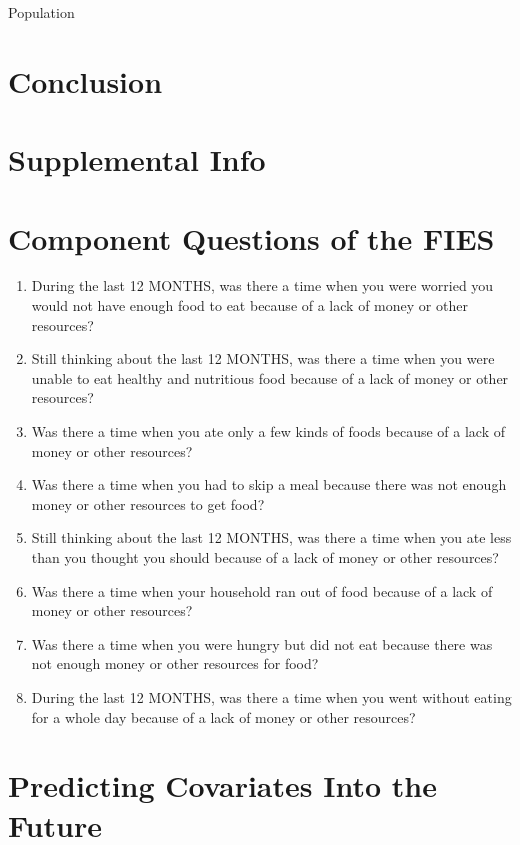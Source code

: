 \documentclass{article}
\begin{document}
Population \citep{Smits2019, KC2017}

\section{Conclusion}

\printbibliography

\section*{Supplemental Info}
\setcounter{table}{0}
\setcounter{figure}{0}
\setcounter{section}{0}
\renewcommand{\thetable}{S\arabic{table}}
\renewcommand{\thefigure}{S\arabic{figure}}
\renewcommand{\thesection}{S\arabic{section}}

\section{Component Questions of the FIES}
\begin{enumerate}
	\item During the last 12 MONTHS, was there a time when you were worried you would not have enough food to eat because of a lack of money or other resources?
	\item Still thinking about the last 12 MONTHS, was there a time when you were unable to eat healthy and nutritious food because of a lack of money or other resources?
	\item Was there a time when you ate only a few kinds of foods because of a lack of money or other resources?
	\item Was there a time when you had to skip a meal because there was not enough money or other resources to get food?
	\item Still thinking about the last 12 MONTHS, was there a time when you ate less than you thought you should because of a lack of money or other resources?
	\item Was there a time when your household ran out of food because of a lack of money or other resources?
	\item Was there a time when you were hungry but did not eat because there was not enough money or other resources for food?
	\item During the last 12 MONTHS, was there a time when you went without eating for a whole day because of a lack of money or other resources?
\end{enumerate}

\section{Predicting Covariates Into the Future}
\end{document}
